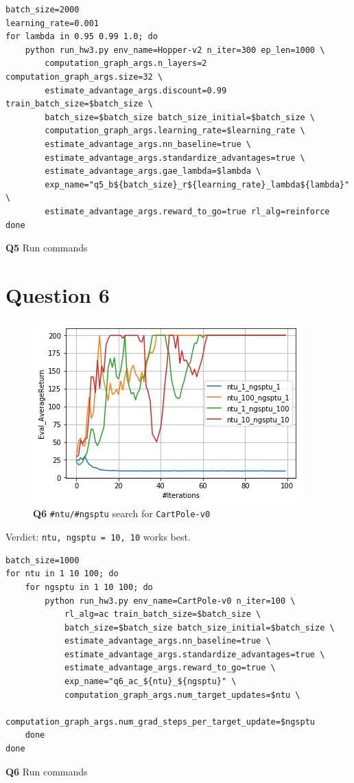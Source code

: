 \documentclass[11pt]{article}
\begin{document}
\begin{listing}[htbp]
\begin{verbatim}
batch_size=2000
learning_rate=0.001
for lambda in 0.95 0.99 1.0; do
    python run_hw3.py env_name=Hopper-v2 n_iter=300 ep_len=1000 \
        computation_graph_args.n_layers=2 computation_graph_args.size=32 \
        estimate_advantage_args.discount=0.99 train_batch_size=$batch_size \
        batch_size=$batch_size batch_size_initial=$batch_size \
        computation_graph_args.learning_rate=$learning_rate \
        estimate_advantage_args.nn_baseline=true \
        estimate_advantage_args.standardize_advantages=true \
        estimate_advantage_args.gae_lambda=$lambda \
        exp_name="q5_b${batch_size}_r${learning_rate}_lambda${lambda}" \
        estimate_advantage_args.reward_to_go=true rl_alg=reinforce
done
\end{verbatim}
\caption{\textbf{Q5} Run commands}
\end{listing}

\clearpage
\section{Question 6}
\label{sec:org5d56b78}

\begin{figure}[htbp]
\centering
\includegraphics[width=.9\linewidth]{./6.png}
\caption{\textbf{Q6} \texttt{\#ntu/\#ngsptu} search for \texttt{CartPole-v0}}
\end{figure}

Verdict: \texttt{ntu, ngsptu = 10, 10} works best.

\begin{listing}[htbp]
\begin{verbatim}
batch_size=1000
for ntu in 1 10 100; do
    for ngsptu in 1 10 100; do
        python run_hw3.py env_name=CartPole-v0 n_iter=100 \
            rl_alg=ac train_batch_size=$batch_size \
            batch_size=$batch_size batch_size_initial=$batch_size \
            estimate_advantage_args.nn_baseline=true \
            estimate_advantage_args.standardize_advantages=true \
            estimate_advantage_args.reward_to_go=true \
            exp_name="q6_ac_${ntu}_${ngsptu}" \
            computation_graph_args.num_target_updates=$ntu \
            computation_graph_args.num_grad_steps_per_target_update=$ngsptu
    done
done
\end{verbatim}
\caption{\textbf{Q6} Run commands}
\end{listing}
\end{document}

